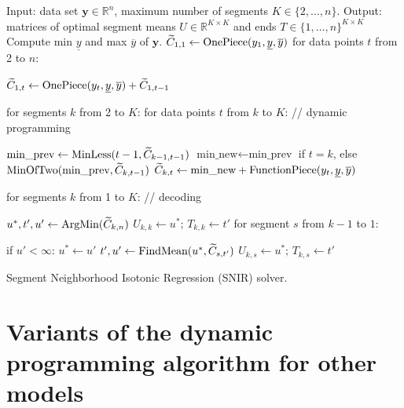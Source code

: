\documentclass{article}
\newcommand{\RR}{\mathbb R}
\begin{document}
\begin{algorithm}[H]
\begin{algorithmic}[1]
\STATE Input: data set $\mathbf y\in\RR^n$, maximum number of segments $K\in\{2,\dots, n\}$.
\STATE Output: matrices of optimal segment means $U\in\RR^{K\times K}$ 
and ends $T\in\{1,\dots,n\}^{K\times K}$
\STATE Compute min $\underline y$ and max $\overline y$ of $\mathbf y$.
\STATE $\widetilde{C}_{1,1}\gets \text{OnePiece}(y_1, \underline y, \overline y)$
\STATE for data points $t$ from 2 to $n$:
\begin{ALC@g}
  \STATE $\widetilde{C}_{1,t}\gets \text{OnePiece}(y_t, \underline y, \overline y) + \widetilde{C}_{1,t-1}$
\end{ALC@g}
\STATE for segments $k$ from 2 to $K$: for data points $t$ from $k$ to $K$: // dynamic programming
\begin{ALC@g}
  \STATE $\text{min\_prev}\gets \text{MinLess}(t-1, \widetilde{C}_{k-1,t-1})$
  \label{line:MinLess}
    \STATE $\text{min\_new}\gets\text{min\_prev}$ if $t=k$, 
else $\text{MinOfTwo}(\text{min\_prev}, \widetilde{C}_{k, t-1})$
  \STATE $\widetilde{C}_{k,t}\gets \text{min\_new} + \text{FunctionPiece}(y_t, \underline y, \overline y)$
\end{ALC@g}
\STATE for segments $k$ from 1 to $K$: // decoding
\begin{ALC@g}
  \STATE $u^*,t',u'\gets \text{ArgMin}(\widetilde{C}_{k,n})$
  \STATE $U_{k,k}\gets u^*;\, T_{k,k}\gets t'$
  \STATE for segment $s$ from $k-1$ to $1$:
  \begin{ALC@g}
    \STATE if $u' < \infty$: $u^*\gets u'$
    \STATE $t',u'\gets\text{FindMean}(u^*, \widetilde{C}_{s,t'})$
    \STATE $U_{k,s}\gets u^*;\, T_{k,s}\gets t'$
  \end{ALC@g}
\end{ALC@g}
\caption{\label{algo:SNIR}Segment Neighborhood Isotonic Regression (SNIR) solver.}
\end{algorithmic}
\end{algorithm}

\section{Variants of the dynamic programming algorithm for other models}
\end{document}
